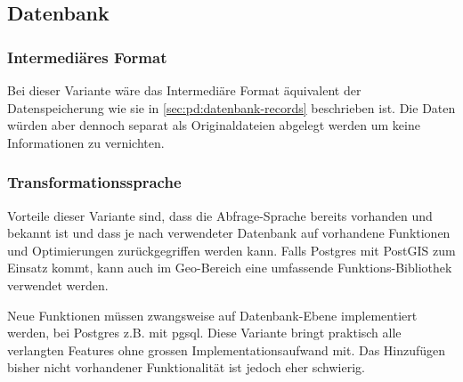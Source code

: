 
\subsection{Datenbank}
\subsubsection{Intermediäres Format}
Bei dieser Variante wäre das Intermediäre Format äquivalent der Datenspeicherung wie sie in \cref{sec:pd:datenbank-records} beschrieben ist. Die Daten würden aber dennoch separat als Originaldateien abgelegt werden um keine Informationen zu vernichten. 

\subsubsection{Transformationssprache}

Vorteile dieser Variante sind, dass die Abfrage-Sprache bereits vorhanden und bekannt ist und dass je nach verwendeter Datenbank auf vorhandene Funktionen und Optimierungen zurückgegriffen werden kann. Falls Postgres mit PostGIS zum Einsatz kommt, kann auch im Geo-Bereich eine umfassende Funktions-Bibliothek verwendet werden. 

Neue Funktionen müssen zwangsweise auf Datenbank-Ebene implementiert werden, bei Postgres z.B. mit \ac{pgsql}.
Diese Variante bringt praktisch alle verlangten Features ohne grossen Implementationsaufwand mit. Das Hinzufügen bisher nicht vorhandener Funktionalität ist jedoch eher schwierig.

